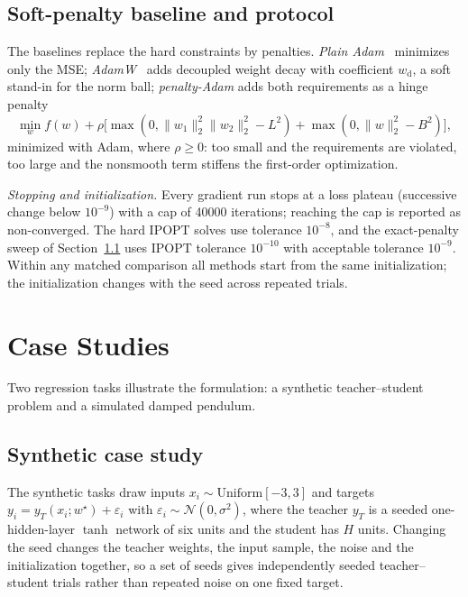 \documentclass[conference]{IEEEtran}
\newcommand{\wvec}{w}
\newcommand{\Lmax}{L}
\newcommand{\Bmax}{B}
\newcommand{\wdcoef}{w_{\mathrm{d}}}
\newcommand{\norm}[1]{\lVert #1 \rVert}
\begin{document}
\subsection{Soft-penalty baseline and protocol}
The baselines replace the hard constraints by penalties. \emph{Plain Adam}~\cite{adam}
minimizes only the MSE; \emph{AdamW}~\cite{adamw} adds decoupled weight decay with
coefficient $\wdcoef$, a soft stand-in for the norm ball; \emph{penalty-Adam} adds
both requirements as a hinge penalty
\begin{equation}
\min_{\wvec} f(\wvec)+\rho\bigl[\max(0,\norm{\wvec_1}_2^2\norm{\wvec_2}_2^2-\Lmax^2)
+\max(0,\norm{\wvec}_2^2-\Bmax^2)\bigr],
\label{eq:penalty}
\end{equation}
minimized with Adam, where $\rho\ge0$: too small and the requirements are violated,
too large and the nonsmooth term stiffens the first-order optimization.

\emph{Stopping and initialization.} Every gradient run stops at a loss plateau
(successive change below $10^{-9}$) with a cap of \num{40000} iterations; reaching
the cap is reported as non-converged. The hard IPOPT solves use tolerance $10^{-8}$,
and the exact-penalty sweep of Section~\ref{sec:synth} uses IPOPT tolerance
$10^{-10}$ with acceptable tolerance $10^{-9}$. Within any matched comparison all
methods start from the same initialization; the initialization changes with the seed
across repeated trials.

\section{Case Studies}\label{sec:cases}
Two regression tasks illustrate the formulation: a synthetic teacher--student
problem and a simulated damped pendulum.

\subsection{Synthetic case study}\label{sec:synth}
The synthetic tasks draw inputs $x_i\sim\mathrm{Uniform}[-3,3]$ and targets
$y_i=y_T(x_i;\wvec^\star)+\varepsilon_i$ with $\varepsilon_i\sim\mathcal N(0,\sigma^2)$,
where the teacher $y_T$ is a seeded one-hidden-layer $\tanh$ network of six units and
the student has $H$ units. Changing the seed changes the teacher weights, the input
sample, the noise and the initialization together, so a set of seeds gives
independently seeded teacher--student trials rather than repeated noise on one fixed
target.
\end{document}
